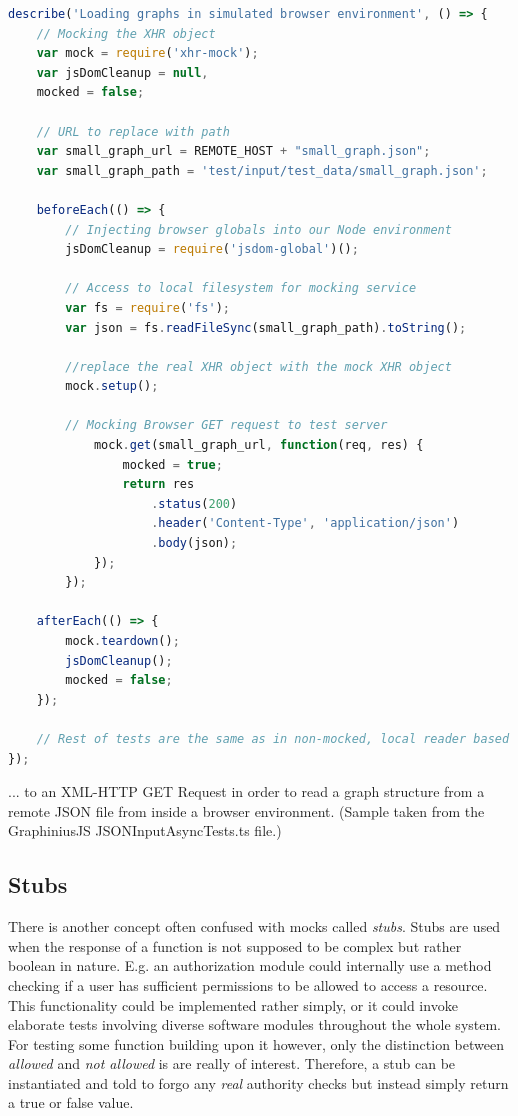 	\begin{lstlisting}[caption={A mocking setup simulating a Web Server GET response...}, label={fig:mock_service_test}, language=JavaScript]
describe('Loading graphs in simulated browser environment', () => {		
	// Mocking the XHR object
	var mock = require('xhr-mock');
	var jsDomCleanup = null,
	mocked = false;
	
	// URL to replace with path
	var small_graph_url = REMOTE_HOST + "small_graph.json";
	var small_graph_path = 'test/input/test_data/small_graph.json';
	
	beforeEach(() => {		
		// Injecting browser globals into our Node environment
		jsDomCleanup = require('jsdom-global')();
		
		// Access to local filesystem for mocking service
		var fs = require('fs');
		var json = fs.readFileSync(small_graph_path).toString();
		
		//replace the real XHR object with the mock XHR object
		mock.setup();
	
		// Mocking Browser GET request to test server
			mock.get(small_graph_url, function(req, res) {
				mocked = true;
				return res
					.status(200)
					.header('Content-Type', 'application/json')
					.body(json);
			});
		});
		
	afterEach(() => {
		mock.teardown();
		jsDomCleanup();
		mocked = false;
	});
	
	// Rest of tests are the same as in non-mocked, local reader based input tests
});
	\end{lstlisting}
	\small
	... to an XML-HTTP GET Request in order to read a graph structure from a remote JSON file from inside a browser environment. (Sample taken from the GraphiniusJS JSONInputAsyncTests.ts file.)
	
	
	\subsection{Stubs}
	\label{ssect:stubs}
	There is another concept often confused with mocks called \textit{stubs}. Stubs are used when the response of a function is not supposed to be complex but rather boolean in nature. E.g. an authorization module could internally use a method checking if a user has sufficient permissions to be allowed to access a resource. This functionality could be implemented rather simply, or it could invoke elaborate tests involving diverse software modules throughout the whole system. For testing some function building upon it however, only the distinction between \textit{allowed} and \textit{not allowed} is are really of interest. Therefore, a stub can be instantiated and told to forgo any \textit{real} authority checks but instead simply return a true or false value. 
	
